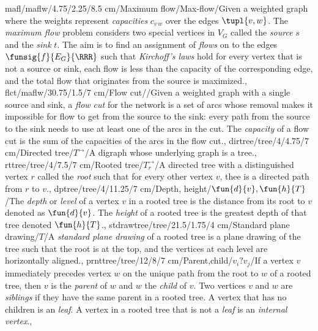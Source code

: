 mafl/maflw/4.75/2.25/8.5 cm/{Maximum flow}/{Max-flow}/{Given a weighted graph where the weights represent \emph{capacities} $c_{v\,w}$ over the edges $\tupl{v,w}$. The \emph{maximum flow} problem considers two special vertices in $V_G$ called the \emph{source} $s$ and the \emph{sink} $t$. The aim is to find an assignment of \emph{flows} on to the edges $\funsig{f}{E_G}{\RRR}$ such that \emph{Kirchoff's laws} hold for every vertex that is not a source or sink, each flow is less than the capacity of the corresponding edge, and the total flow that originates from the source is maximized.},
flct/maflw/30.75/1.5/7 cm/{Flow cut}/{\watertap\Leftscissors}/{Given a weighted graph with a single source and sink, a \emph{flow cut} for the network is a set of arcs whose removal makes it impossible for flow to get from the source to the sink: every path from the source to the sink needs to use at least one of the arcs in the cut. The \emph{capacity} of a flow cut is the sum of the capacities of the arcs in the flow cut.},
dirtree/tree/4/4.75/7 cm/{Directed tree}/{$T^{\rightarrow}$}/{A digraph whose underlying graph is a tree.},%
rttree/tree/4/7.5/7 cm/{Rooted tree}/{$T^{\rightarrow}_r$}/{A directed tree with a distinguished vertex $r$ called the \emph{root} such that for every other vertex $v$, thee is a directed path from $r$ to $v$.},%
dptree/tree/4/11.25/7 cm/{Depth, height}/{$\fun{d}{v},\fun{h}{T}$}/{The \emph{depth} or \emph{level} of a vertex $v$ in a rooted tree is the distance from its root to $v$ denoted as $\fun{d}{v}$. The \emph{height} of a rooted tree is the greatest depth of that tree denoted $\fun{h}{T}$.},%
stdrawtree/tree/21.5/1.75/4 cm/{Standard plane drawing}/{\smallpencil $T$}/{A \emph{standard plane drawing} of a rooted tree is a plane drawing of the tree such that the root is at the top, and the vertices at each level are horizontally aligned.},%
prnttree/tree/12/8/7 cm/{Parent,child}/{$v_i ? v_j$}/{If a vertex $v$ immediately precedes vertex $w$ on the unique path from the root to $w$ of a rooted tree, then $v$ is the \emph{parent} of $w$ and $w$ the \emph{child} of $v$. Two vertices $v$ and $w$ are \emph{siblings} if they have the same parent in a rooted tree. A vertex that has no children is an \emph{leaf}. A vertex in a rooted tree that is not a \emph{leaf} is an \emph{internal vertex}.},%

